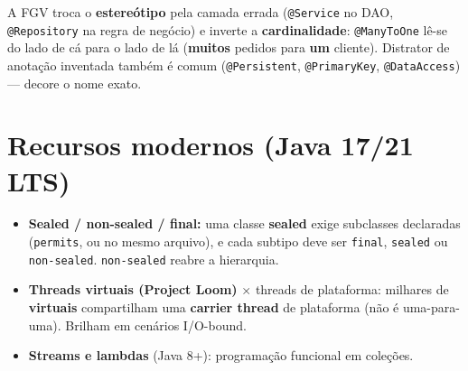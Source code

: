\begin{pegadinha}
A FGV troca o \textbf{estereótipo} pela camada errada (\texttt{@Service} no
DAO, \texttt{@Repository} na regra de negócio) e inverte a
\textbf{cardinalidade}: \texttt{@ManyToOne} lê-se do lado de cá para o lado
de lá (\textbf{muitos} pedidos para \textbf{um} cliente). Distrator de
anotação inventada também é comum (\texttt{@Persistent},
\texttt{@PrimaryKey}, \texttt{@DataAccess}) --- decore o nome exato.
\end{pegadinha}

\section{Recursos modernos (Java 17/21 LTS)}

\begin{itemize}
\item \textbf{Sealed / non-sealed / final:} uma classe \textbf{sealed}
exige subclasses declaradas (\texttt{permits}, ou no mesmo arquivo), e cada
subtipo deve ser \texttt{final}, \texttt{sealed} ou \texttt{non-sealed}.
\texttt{non-sealed} reabre a hierarquia.
\item \textbf{Threads virtuais (Project Loom)} $\times$ threads de
plataforma: milhares de \textbf{virtuais} compartilham uma \textbf{carrier
thread} de plataforma (não é uma-para-uma). Brilham em cenários I/O-bound.
\item \textbf{Streams e lambdas} (Java 8+): programação funcional em
coleções.
\end{itemize}

